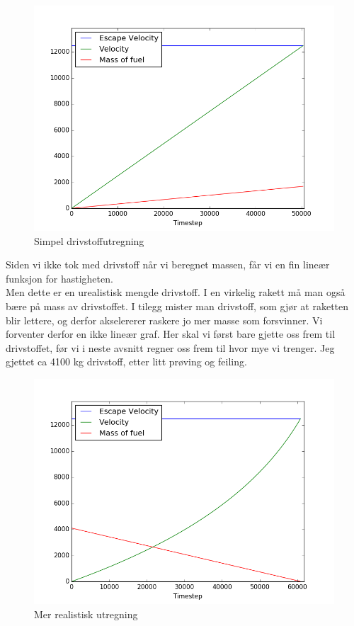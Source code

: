\documentclass[a4paper,norsk,11pt,twoside]{article}
\begin{document}
\begin{figure}[hbt]
\begin{center}
\includegraphics[width=\textwidth]{Fuel_simple.png}
\caption{Simpel drivstoffutregning}\label{fig:finfigur}
\end{center}
\end{figure} 


Siden vi ikke tok med drivstoff når vi beregnet massen, får vi en fin lineær funksjon for hastigheten. \\

Men dette er en urealistisk mengde drivstoff. I en virkelig rakett må man også bære på mass av drivstoffet. I tilegg mister man drivstoff, som gjør at raketten blir lettere, og derfor akselererer raskere jo mer masse som forsvinner. Vi forventer derfor en ikke lineær graf. Her skal vi først bare gjette oss frem til drivstoffet, før vi i neste avsnitt regner oss frem til hvor mye vi trenger. Jeg gjettet ca 4100 kg drivstoff, etter litt prøving og feiling. 

\begin{figure}[hbt]
\begin{center}
\includegraphics[width=\textwidth]{Fuel_real.png}
\caption{Mer realistisk utregning}\label{fig:finfigur}
\end{center}
\end{figure} 
\end{document}
